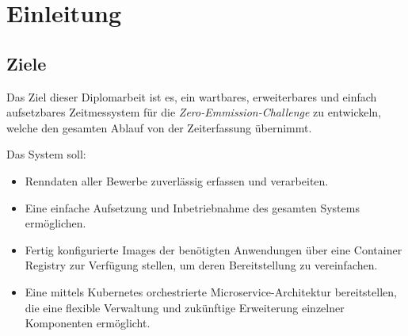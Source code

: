 \section{Einleitung}
\subsection{Ziele}

Das Ziel dieser Diplomarbeit ist es, ein wartbares, erweiterbares und einfach aufsetzbares Zeitmessystem für die \textit{Zero-Emmission-Challenge} zu entwickeln, welche den gesamten Ablauf von der Zeiterfassung übernimmt.

Das System soll:

\begin{itemize}
    \item Renndaten aller Bewerbe zuverlässig erfassen und verarbeiten.
    \item Eine einfache Aufsetzung und Inbetriebnahme des gesamten Systems ermöglichen.
    \item Fertig konfigurierte Images der benötigten Anwendungen über eine Container Registry zur Verfügung stellen, um deren Bereitstellung zu vereinfachen.
    \item Eine mittels Kubernetes orchestrierte Microservice-Architektur bereitstellen, die eine flexible Verwaltung und zukünftige Erweiterung einzelner Komponenten ermöglicht.
\end{itemize}